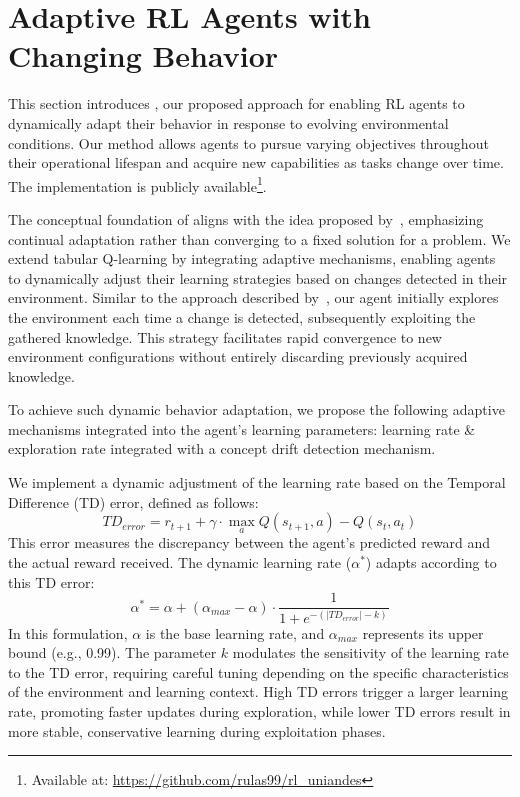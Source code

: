 
\section{Adaptive \ac{RL} Agents with Changing Behavior}
\label{sec:implementation}

This section introduces \adaptiverl, our proposed approach for enabling \ac{RL} agents to dynamically adapt their behavior in response to evolving environmental conditions. Our method allows agents to pursue varying objectives throughout their operational lifespan and acquire new capabilities as tasks change over time. The implementation is publicly available\footnote{Available at: \url{https://github.com/rulas99/rl_uniandes}}.

The conceptual foundation of \adaptiverl aligns with the idea proposed by~\citet{abel2023definitioncontinualreinforcementlearning}, emphasizing continual adaptation rather than converging to a fixed solution for a problem. We extend tabular Q-learning by integrating adaptive mechanisms, enabling agents to dynamically adjust their learning strategies based on changes detected in their environment. Similar to the approach described by~\citet{norman2024firstexploreexploitmetalearningsolve}, our agent initially explores the environment each time a change is detected, subsequently exploiting the gathered knowledge. This strategy facilitates rapid convergence to new environment configurations without entirely discarding previously acquired knowledge.

To achieve such dynamic behavior adaptation, we propose the following adaptive mechanisms integrated into the agent’s learning parameters: learning rate \& exploration rate integrated with a concept drift detection mechanism.

We implement a dynamic adjustment of the learning rate based on the Temporal Difference (TD) error, defined as follows:
\begin{equation}
    \label{eq:td_error}
    TD_{error} = r_{t+1} + \gamma \cdot \underset{a}{\max} Q(s_{t+1}, a) - Q(s_t, a_t)
\end{equation}
This error measures the discrepancy between the agent’s predicted reward and the actual reward received. The dynamic learning rate ($\alpha^*$) adapts according to this TD error:
\begin{equation}
    \label{eq:dynamic_learning_rate}
    \alpha^* = \alpha + (\alpha_{max}-\alpha) \cdot \frac{1}{1 + e^{-(|TD_{error}|-k)}}
\end{equation}
In this formulation, $\alpha$ is the base learning rate, and $\alpha_{max}$ represents its upper bound (e.g., 0.99). The parameter $k$ modulates the sensitivity of the learning rate to the TD error, requiring careful tuning depending on the specific characteristics of the environment and learning context. High TD errors trigger a larger learning rate, promoting faster updates during exploration, while lower TD errors result in more stable, conservative learning during exploitation phases.

